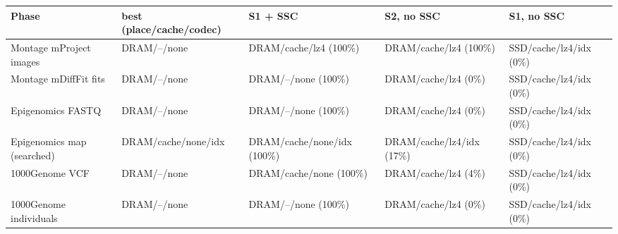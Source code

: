 \begin{tabular}{lllll}
\toprule
Phase & best (place/cache/codec) & S1 + SSC & S2, no SSC & S1, no SSC \\
\midrule
Montage mProject images & DRAM/--/none & DRAM/cache/lz4 (100\%) & DRAM/cache/lz4 (100\%) & SSD/cache/lz4/idx (0\%) \\
Montage mDiffFit fits & DRAM/--/none & DRAM/--/none (100\%) & DRAM/cache/lz4 (0\%) & SSD/cache/lz4/idx (0\%) \\
Epigenomics FASTQ & DRAM/--/none & DRAM/--/none (100\%) & DRAM/cache/lz4 (0\%) & SSD/cache/lz4/idx (0\%) \\
Epigenomics map (searched) & DRAM/cache/none/idx & DRAM/cache/none/idx (100\%) & DRAM/cache/lz4/idx (17\%) & SSD/cache/lz4/idx (0\%) \\
1000Genome VCF & DRAM/--/none & DRAM/cache/none (100\%) & DRAM/cache/lz4 (4\%) & SSD/cache/lz4/idx (0\%) \\
1000Genome individuals & DRAM/--/none & DRAM/--/none (100\%) & DRAM/cache/lz4 (0\%) & SSD/cache/lz4/idx (0\%) \\
\bottomrule
\end{tabular}
